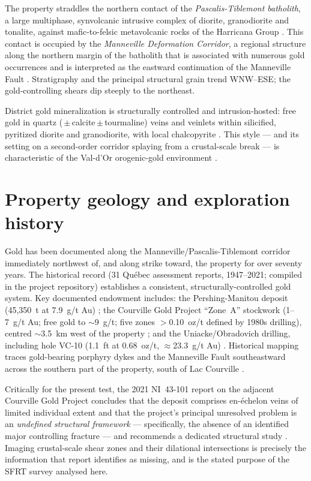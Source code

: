\documentclass[11pt]{article}
\begin{document}
The property straddles the northern contact of the \emph{Pascalis-Tiblemont batholith}, a large
multiphase, synvolcanic intrusive complex of diorite, granodiorite and tonalite, against
mafic-to-felsic metavolcanic rocks of the Harricana Group \citep{globex_courville,lafleur2026}.
This contact is occupied by the \emph{Manneville Deformation Corridor}, a regional structure
along the northern margin of the batholith that is associated with numerous gold occurrences and
is interpreted as the eastward continuation of the Manneville Fault
\citep{globex_courville,lafleur2026,bischoff1965}. Stratigraphy and the principal structural
grain trend WNW--ESE; the gold-controlling shears dip steeply to the northeast.

District gold mineralization is structurally controlled and intrusion-hosted: free gold in
quartz (\,$\pm$\,calcite\,$\pm$\,tourmaline) veins and veinlets within silicified, pyritized
diorite and granodiorite, with local chalcopyrite \citep{globex_courville,laverdiere2021}. This
style --- and its setting on a second-order corridor splaying from a crustal-scale break --- is
characteristic of the Val-d'Or orogenic-gold environment \citep{dube2007}.

\section{Property geology and exploration history}
Gold has been documented along the Manneville/Pascalis-Tiblemont corridor immediately northwest
of, and along strike toward, the property for over seventy years. The historical record
(31 Qu\'ebec assessment reports, 1947--2021; compiled in the project repository) establishes a
consistent, structurally-controlled gold system. Key documented endowment includes:
the Pershing-Manitou deposit (45,350~t at 7.9~g/t Au) \citep{beauregard1990};
the Courville Gold Project ``Zone~A'' stockwork (1--7~g/t Au; free gold to $\sim$9~g/t; five
zones $>$0.10~oz/t defined by 1980s drilling), centred $\sim$3.5~km west of the property
\citep{patel1988,laverdiere2021}; and the Uniacke/Obradovich drilling, including hole VC-10
(1.1~ft at 0.68~oz/t, $\approx$23.3~g/t Au) \citep{hawley1994}. Historical mapping traces
gold-bearing porphyry dykes and the Manneville Fault southeastward across the southern part of
the property, south of Lac Courville \citep{bischoff1965}.

Critically for the present test, the 2021 NI~43-101 report on the adjacent Courville Gold
Project concludes that the deposit comprises en-\'echelon veins of limited individual extent and
that the project's principal unresolved problem is an \emph{undefined structural framework} ---
specifically, the absence of an identified major controlling fracture --- and recommends a
dedicated structural study \citep{laverdiere2021}. Imaging crustal-scale shear zones and their
dilational intersections is precisely the information that report identifies as missing, and is
the stated purpose of the SFRT survey analysed here.
\end{document}
